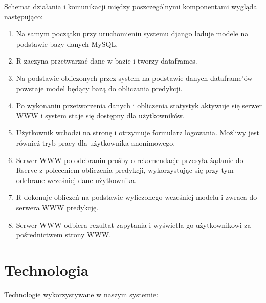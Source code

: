 \documentclass[licencjacka]{pracamgr}
\begin{document}
Schemat działania i komunikacji między poszczególnymi komponentami wygląda następująco:
\begin{enumerate}

\item Na samym początku przy uruchomieniu systemu django ładuje modele na podstawie bazy danych MySQL.

\item R zaczyna przetwarzać dane w bazie i tworzy dataframes.

\item Na podstawie obliczonych przez system na podstawie danych dataframe'ów powstaje model będący bazą do obliczania predykcji.

\item Po wykonaniu przetworzenia danych i obliczenia statystyk aktywuje się serwer WWW i system staje się dostępny dla użytkowników.

\item Użytkownik wchodzi na stronę i otrzymuje formularz logowania. Możliwy jest również tryb pracy dla użytkownika anonimowego.

\item Serwer WWW po odebraniu prośby o rekomendacje przesyła żądanie do Rserve z poleceniem obliczenia predykcji, wykorzystując się przy tym odebrane wcześniej dane użytkownika.

\item R dokonuje obliczeń na podstawie wyliczonego wcześniej modelu i zwraca do serwera WWW predykcję.

\item Serwer WWW odbiera rezultat zapytania i wyświetla go użytkownikowi za pośrednictwem strony WWW.

\end{enumerate}


 \chapter{Technologia}
Technologie wykorzystywane w naszym systemie: \par
\end{document}
